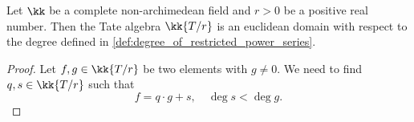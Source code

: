     \begin{corollary}\label{cor:Tate_alg_in_one_variable_over_field_is_ED}
        Let \(\kk\) be a complete non-archimedean field and \(r > 0\) be a positive real number.
        Then the Tate algebra \(\kk\{T/r\}\) is an euclidean domain with respect to the degree defined in \cref{def:degree_of_restricted_power_series}.
    \end{corollary}
    \begin{proof}
        Let \(f, g \in \kk\{T/r\}\) be two elements with \(g \neq 0\).
        We need to find \(q, s \in \kk\{T/r\}\) such that
        \[ f = q \cdot g + s, \quad \deg s < \deg g.\]
    \end{proof}





